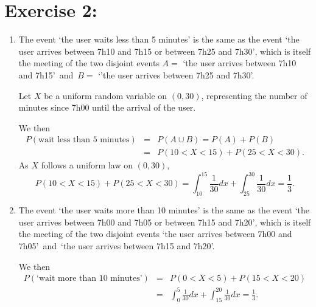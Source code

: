 \documentclass[12pt,thmsa]{article}
\begin{document}
\section*{Exercise 2:}
\begin{enumerate}%
\item The event {`the user waits less than 5 minutes'} is the same as the event {`the user arrives between 7h10 and 7h15  or between 7h25 and 7h30',}
which is itself the meeting of the two disjoint events
 {$A=$ `the user arrives between 7h10 and 7h15'\, and\, $B=$ `'the user arrives between 7h25 and 7h30'.}
\smallskip

Let $X$ be a uniform random variable on $(0,30)$, representing the number of minutes since 7h00 until the arrival of the user.

We then
 \begin{eqnarray*}
P(\mbox{wait less than 5 minutes}) &=& P(A \cup B) = P(A) + P(B)\\
 &=&
P(10<X<15) + P(25<X<30).
 \end{eqnarray*}
As $X$ follows a uniform law on $(0,30)$,
$$
P(10<X<15) + P(25<X<30) = \int_{10}^{15} \frac{1}{30}dx +
\int_{25}^{30} \frac{1}{30}dx = \frac{1}{3}.
$$

\item The event {`the user waits more than 10 minutes'} is the same as the event {`the user arrives between 7h00 and 7h05 or between 7h15 and 7h20',}
which is itself the meeting of the two disjoint events 
 `the user arrives between 7h00 and 7h05'\, and\, `the user arrives between 7h15 and 7h20'.
\smallskip

We then
 \begin{eqnarray*}
P(\mbox{`wait more than 10 minutes'}) &=& P(0<X<5) + P(15<X<20) \\
&=& \int_{0}^{5} \frac{1}{30}dx +
\int_{15}^{20} \frac{1}{30}dx = \frac{1}{3}.
 \end{eqnarray*}
\end{enumerate}
\end{document}
